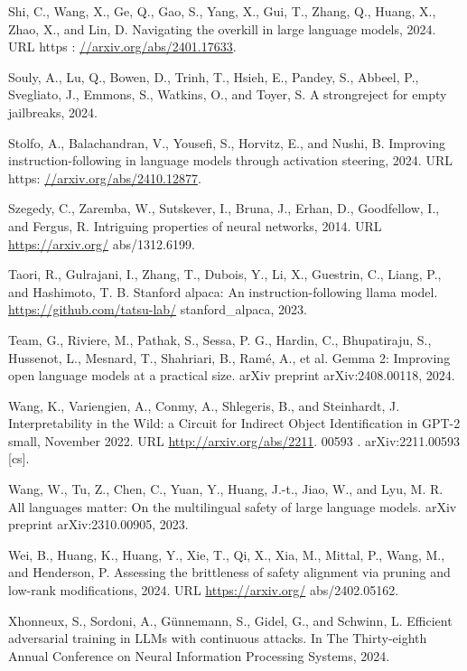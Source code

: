 \documentclass[10pt]{article}
\begin{document}
Shi, C., Wang, X., Ge, Q., Gao, S., Yang, X., Gui, T., Zhang, Q., Huang, X., Zhao, X., and Lin, D. Navigating the overkill in large language models, 2024. URL https : \href{//arxiv.org/abs/2401.17633}{//arxiv.org/abs/2401.17633}.

Souly, A., Lu, Q., Bowen, D., Trinh, T., Hsieh, E., Pandey, S., Abbeel, P., Svegliato, J., Emmons, S., Watkins, O., and Toyer, S. A strongreject for empty jailbreaks, 2024.

Stolfo, A., Balachandran, V., Yousefi, S., Horvitz, E., and Nushi, B. Improving instruction-following in language models through activation steering, 2024. URL https: \href{//arxiv.org/abs/2410.12877}{//arxiv.org/abs/2410.12877}.

Szegedy, C., Zaremba, W., Sutskever, I., Bruna, J., Erhan, D., Goodfellow, I., and Fergus, R. Intriguing properties of neural networks, 2014. URL \href{https://arxiv.org/}{https://arxiv.org/} abs/1312.6199.

Taori, R., Gulrajani, I., Zhang, T., Dubois, Y., Li, X., Guestrin, C., Liang, P., and Hashimoto, T. B. Stanford alpaca: An instruction-following llama model. \href{https://github.com/tatsu-lab/}{https://github.com/tatsu-lab/} stanford\_alpaca, 2023.

Team, G., Riviere, M., Pathak, S., Sessa, P. G., Hardin, C., Bhupatiraju, S., Hussenot, L., Mesnard, T., Shahriari, B., Ramé, A., et al. Gemma 2: Improving open language models at a practical size. arXiv preprint arXiv:2408.00118, 2024.

Wang, K., Variengien, A., Conmy, A., Shlegeris, B., and Steinhardt, J. Interpretability in the Wild: a Circuit for Indirect Object Identification in GPT-2 small, November 2022. URL \href{http://arxiv.org/abs/2211}{http://arxiv.org/abs/2211}. 00593 . arXiv:2211.00593 [cs].

Wang, W., Tu, Z., Chen, C., Yuan, Y., Huang, J.-t., Jiao, W., and Lyu, M. R. All languages matter: On the multilingual safety of large language models. arXiv preprint arXiv:2310.00905, 2023.

Wei, B., Huang, K., Huang, Y., Xie, T., Qi, X., Xia, M., Mittal, P., Wang, M., and Henderson, P. Assessing the brittleness of safety alignment via pruning and low-rank modifications, 2024. URL \href{https://arxiv.org/}{https://arxiv.org/} abs/2402.05162.

Xhonneux, S., Sordoni, A., Günnemann, S., Gidel, G., and Schwinn, L. Efficient adversarial training in LLMs with continuous attacks. In The Thirty-eighth Annual Conference on Neural Information Processing Systems, 2024.
\end{document}
